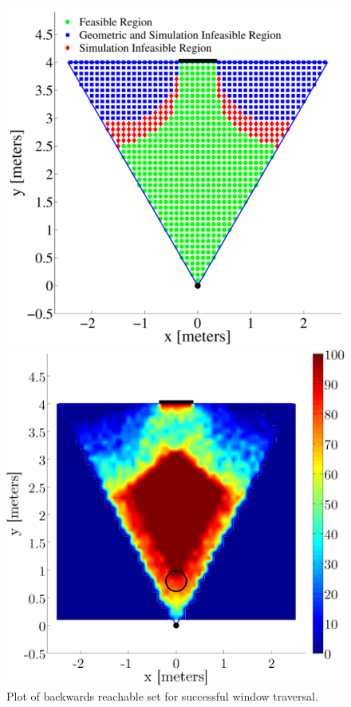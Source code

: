 \documentclass{aamas2013}
\begin{document}
\begin{figure}[tb]
\begin{minipage}[t]{0.45\linewidth}
\includegraphics[width=\textwidth]{figures/feasible_set.pdf}
\caption{Plot of backwards reachable set for successful window traversal.}
\label{fig:feasible_set}
\end{minipage}
\hfill
\begin{minipage}[t]{0.47\linewidth}
\centering
\centering
\includegraphics[width=\textwidth]{figures/heat_map.png}

\end{minipage}
\end{figure}
\end{document}
